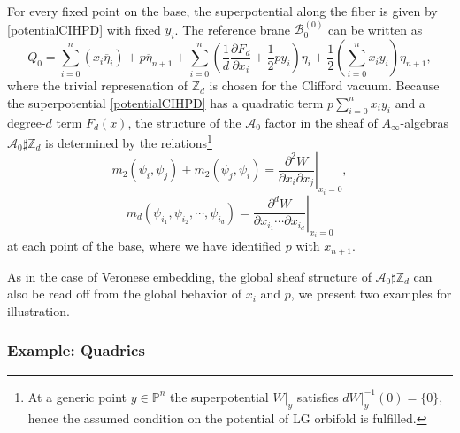 \documentclass[a4paper,11pt]{article}
\def\cA{\mathcal{A}}
\newcommand{\Af}{{A_\infty}}
\numberwithin{equation}{section}
\begin{document}
For every fixed point on the base, the superpotential along the fiber is given 
by \eqref{potentialCIHPD} with fixed $y_i$. The reference brane 
$\mathcal{B}^{(0)}_{0}$ can be written as
\[
Q_{0} = \sum_{i=0}^n (x_i \overline{\eta}_i) + p\overline{\eta}_{n+1} + 
\sum_{i=0}^n \left( \frac{1}{d}\frac{\partial F_{d}}{\partial x_i} + 
\frac{1}{2} p y_i \right) \eta_i + \frac{1}{2} \left( \sum_{i=0}^n x_i y_i 
\right) \eta_{n+1},
\]
where the trivial represenation of $\mathbb{Z}_{d}$ is chosen for the 
Clifford vacuum. Because the superpotential \eqref{potentialCIHPD} has a 
quadratic term $p \sum_{i=0}^n x_i y_i$ and a degree-$d$ term $F_{d}(x)$, the 
structure of the $\cA_{0}$ factor in the sheaf of $\Af$-algebras 
$\cA_{0}\sharp \mathbb{Z}_{d}$ is determined by the relations\footnote{At a 
generic point $y\in \mathbb{P}^{n}$ the superpotential $W|_{y}$ satisfies 
$dW|_{y}^{-1}(0)=\{ 0\}$, hence the assumed condition on the potential of 
LG orbifold is fulfilled.}
\begin{equation}\label{afmCI1}
m_2(\psi_i,\psi_j) + m_2(\psi_j,\psi_i) = \left.\frac{\partial^2 W}{\partial 
x_i \partial x_j}\right|_{x_i=0},
\end{equation}
\begin{equation}\label{afmCI2}
m_d(\psi_{i_1},\psi_{i_2},\cdots,\psi_{i_d}) = \left. \frac{\partial^d 
W}{\partial x_{i_1} \cdots \partial x_{i_d}} \right|_{x_i=0}
\end{equation}
at each point of the base, where we have identified $p$ with $x_{n+1}$. 

As in the case of Veronese embedding, the global sheaf structure of 
$\cA_{0}\sharp \mathbb{Z}_{d}$ can also be read off from the global behavior 
of $x_i$ and $p$, we present two examples for illustration.

\subsubsection*{Example: Quadrics}
\end{document}
